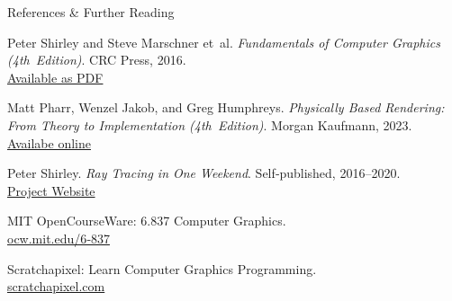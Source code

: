 \begin{frame}{References \& Further Reading}
    \footnotesize
    \begin{thebibliography}{9}
        Peter Shirley and Steve Marschner et~al.
        \textit{Fundamentals of Computer Graphics (4th Edition)}.
        CRC Press, 2016.\\
        \href{http://repo.darmajaya.ac.id/5422/}{Available as PDF}

        Matt Pharr, Wenzel Jakob, and Greg Humphreys.
        \textit{Physically Based Rendering: From Theory to Implementation (4th Edition)}.
        Morgan Kaufmann, 2023.\\
        \href{https://pbr-book.org/4ed/contents}{Availabe online}

        Peter Shirley.
        \textit{Ray Tracing in One Weekend}.
        Self‑published, 2016–2020.\\
        \href{https://raytracing.github.io/}{Project Website}

        MIT OpenCourseWare: 6.837 Computer Graphics.\\
        \href{https://ocw.mit.edu/courses/6-837-computer-graphics-fall-2012/}{ocw.mit.edu/6‑837}

        Scratchapixel: Learn Computer Graphics Programming.\\
        \href{https://www.scratchapixel.com/}{scratchapixel.com}
    \end{thebibliography}
\end{frame}
